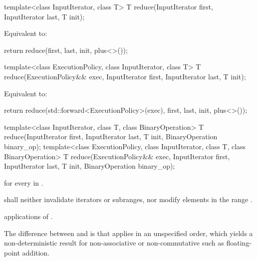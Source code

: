 %
\begin{itemdecl}
template<class InputIterator, class T>
  T reduce(InputIterator first, InputIterator last, T init);
\end{itemdecl}

\begin{itemdescr}
\pnum
\effects Equivalent to:
\begin{codeblock}
return reduce(first, last, init, plus<>());
\end{codeblock}
\end{itemdescr}

%
\begin{itemdecl}
template<class ExecutionPolicy, class InputIterator, class T>
  T reduce(ExecutionPolicy&& exec,
           InputIterator first, InputIterator last, T init);
\end{itemdecl}

\begin{itemdescr}
\pnum
\effects Equivalent to:
\begin{codeblock}
return reduce(std::forward<ExecutionPolicy>(exec), first, last, init, plus<>());
\end{codeblock}
\end{itemdescr}


%
\begin{itemdecl}
template<class InputIterator, class T, class BinaryOperation>
  T reduce(InputIterator first, InputIterator last, T init,
           BinaryOperation binary_op);
template<class ExecutionPolicy, class InputIterator, class T, class BinaryOperation>
  T reduce(ExecutionPolicy&& exec,
           InputIterator first, InputIterator last, T init,
           BinaryOperation binary_op);
\end{itemdecl}

\begin{itemdescr}
\pnum
\returns
{} for every  in .

\pnum
\requires
{} shall neither invalidate iterators or subranges, nor modify
elements in the range .

\pnum
\complexity
{} applications of .

\pnum
\realnotes
The difference between  and  is that
 applies  in an unspecified order, which yields
a non-deterministic result for non-associative or non-commutative
 such as floating-point addition.
\end{itemdescr}

